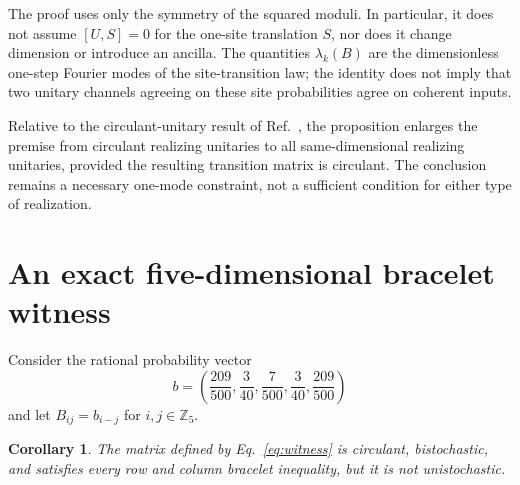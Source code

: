 \documentclass[aip,jmp,preprint,onecolumn,nofootinbib]{revtex4-2}
\newtheorem{corollary}{Corollary}
\begin{document}
The proof uses only the symmetry of the squared moduli.  In particular, it
does not assume $[U,S]=0$ for the one-site translation $S$, nor does it change
dimension or introduce an ancilla.  The quantities $\lambda_k(B)$ are the
dimensionless one-step Fourier modes of the site-transition law; the identity
does not imply that two unitary channels agreeing on these site probabilities
agree on coherent inputs.

Relative to the circulant-unitary result of
Ref.~, the proposition enlarges the premise
from circulant realizing unitaries to all same-dimensional realizing unitaries,
provided the resulting transition matrix is circulant.  The conclusion remains
a necessary one-mode constraint, not a sufficient condition for either type of
realization.

\section{An exact five-dimensional bracelet witness}

Consider the rational probability vector
\begin{equation}
 b=\left(\frac{209}{500},\frac{3}{40},\frac{7}{500},
          \frac{3}{40},\frac{209}{500}\right)
 \label{eq:witness}
\end{equation}
and let $B_{ij}=b_{i-j}$ for $i,j\in\mathbb Z_5$.

\begin{corollary}
The matrix defined by Eq.~\eqref{eq:witness} is circulant, bistochastic, and
satisfies every row and column bracelet inequality, but it is not
unistochastic.
\end{corollary}
\end{document}
